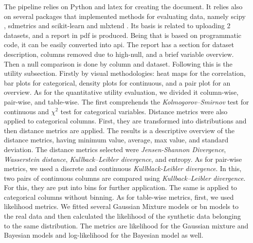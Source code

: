The pipeline relies on Python and latex for creating the document. It relies also on several packages that implemented methods for evaluating data, namely scipy \cite{scipy}, sdmetrics \cite{sdv} and scikit-learn \cite{scikit-learn} and mlxtend \cite{mlxtend}. Its basis is related to uploading 2 datasets, and a report in pdf is produced. Being that is based on programmatic code, it can be easily converted into \ac{api}.
The report has a section for dataset description, columns removed due to high-null, and a brief variable overview. Then a null comparison is done by column and dataset. Following this is the utility subsection. Firstly by visual methodologies: heat maps for the correlation, bar plots for categorical, density plots for continuous, and a pair plot for an overview. As for the quantitative utility evaluation, we divided it column-wise, pair-wise, and table-wise. The first comprehends the \textit{Kolmogorov–Smirnov} test for continuous and $\chi^2$ test for categorical variables.  Distance metrics were also applied to categorical columns. First, they are transformed into distributions and then distance metrics are applied. The results is a descriptive overview of the distance metrics, having minimum value, average, max value, and standard deviation. The distance metrics selected were \textit{Jensen-Shannon Divergence}, \textit{Wasserstein distance}, \textit{Kullback–Leibler divergence}, and entropy.
As for pair-wise metrics, we used a discrete and continuous \textit{Kullblack-Leibler divergence}. In this, two pairs of continuous columns are compared using \textit{Kullback–Leibler divergence}. For this, they are put into bins for further application. The same is applied to categorical columns without binning.
As for table-wise metrics, first, we used likelihood metrics. We fitted several Gaussian Mixture models or \ac{bn} models to the real data and then calculated the likelihood of the synthetic data belonging to the same distribution. The metrics are likelihood for the Gaussian mixture and Bayesian models and log-likelihood for the Bayesian model as well.


